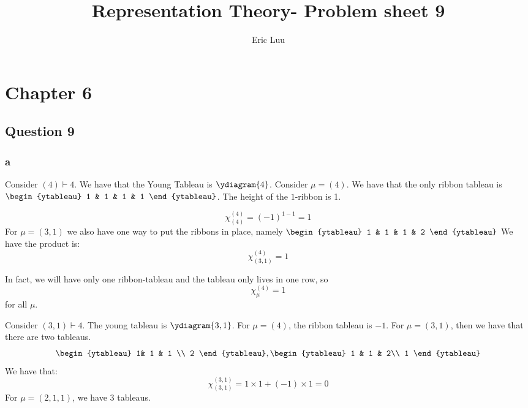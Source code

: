 \documentclass[]{article}
\title{Representation Theory- Problem sheet 9}
\author{Eric Luu}
\begin{document}
\maketitle

\section*{Chapter 6}
\subsection*{Question 9}

\subsubsection*{a}
Consider $(4) \vdash 4$. We have that the Young Tableau is $\ydiagram{4}$. 
Consider $\mu = (4)$. We have that the only ribbon tableau is $\begin{ytableau}
	1 & 1 & 1 & 1
\end{ytableau}
$. The height of the $1$-ribbon is 1. 

\begin{equation}
	\chi^{(4)}_{(4)} = (-1)^{1 - 1} = 1
\end{equation}
For $\mu = (3, 1)$
we also have one way to put the ribbons in place, namely
$\begin{ytableau}
	1 & 1 & 1 & 2
\end{ytableau}
$
 We have the product is:
\begin{equation}
	\chi^{(4)}_{(3,1)} = 1
\end{equation}

In fact, we will have only one ribbon-tableau and the tableau only lives in one row, so
\begin{equation}
	\chi^{(4)}_{\mu} = 1
\end{equation}
for all $\mu$.

Consider $(3,1) \vdash 4$. The young tableau is $\ydiagram{3, 1}$. For $\mu = (4)$, the ribbon tableau is $-1$. 
For $\mu = (3,1)$, then we have that there are two tableaus.
\begin{equation}
	\begin{ytableau}
		1& 1 & 1 \\
		2
	\end{ytableau}
	,
	\begin{ytableau}
		1 & 1 & 2\\
		1
	\end{ytableau}
\end{equation}
We have that:
\begin{equation}
	\chi^{(3,1)}_{(3,1)} = 1 \times 1 + (-1) \times 1 = 0
\end{equation}
For $\mu = (2,1,1)$, we have 3 tableaus. 
\end{document}
